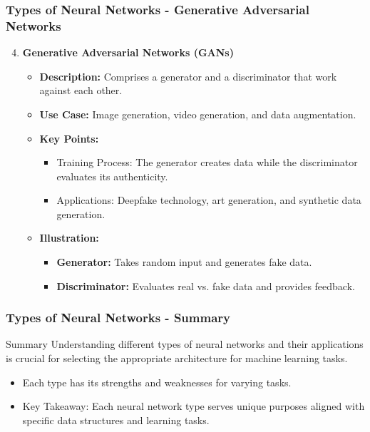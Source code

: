 \documentclass[aspectratio=169]{beamer}
\begin{document}
\begin{frame}[fragile]
    \frametitle{Types of Neural Networks - Generative Adversarial Networks}
    \begin{enumerate}
        \setcounter{enumi}{3}
        \item \textbf{Generative Adversarial Networks (GANs)}
        \begin{itemize}
            \item \textbf{Description:} Comprises a generator and a discriminator that work against each other.
            \item \textbf{Use Case:} Image generation, video generation, and data augmentation.
            \item \textbf{Key Points:}
            \begin{itemize}
                \item Training Process: The generator creates data while the discriminator evaluates its authenticity.
                \item Applications: Deepfake technology, art generation, and synthetic data generation.
            \end{itemize}
            \item \textbf{Illustration:}
            \begin{itemize}
                \item \textbf{Generator:} Takes random input and generates fake data.
                \item \textbf{Discriminator:} Evaluates real vs. fake data and provides feedback.
            \end{itemize}
        \end{itemize}
    \end{enumerate}
\end{frame}

\begin{frame}[fragile]
    \frametitle{Types of Neural Networks - Summary}
    \begin{block}{Summary}
        Understanding different types of neural networks and their applications is crucial for selecting the appropriate architecture for machine learning tasks. 
        \begin{itemize}
            \item Each type has its strengths and weaknesses for varying tasks.
            \item Key Takeaway: Each neural network type serves unique purposes aligned with specific data structures and learning tasks.
        \end{itemize}
    \end{block}
\end{frame}
\end{document}
